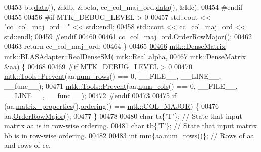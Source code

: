 \begin{DoxyCode}
00453          bb.\hyperlink{classmtk_1_1DenseMatrix_a0c33b8a9e01d157c61ddbdf807c25d84}{data}(), &ldb, &beta, cc\_col\_maj\_ord.\hyperlink{classmtk_1_1DenseMatrix_a0c33b8a9e01d157c61ddbdf807c25d84}{data}(), &ldc);
00454 \textcolor{preprocessor}{  #endif}
00455 
00456 \textcolor{preprocessor}{  #if MTK\_DEBUG\_LEVEL > 0}
00457   std::cout << \textcolor{stringliteral}{"cc\_col\_maj\_ord ="} << std::endl;
00458   std::cout << cc\_col\_maj\_ord << std::endl;
00459 \textcolor{preprocessor}{  #endif}
00460 
00461   cc\_col\_maj\_ord.\hyperlink{classmtk_1_1DenseMatrix_ac2949efba3e8278335d45418c85433e4}{OrderRowMajor}();
00462 
00463   \textcolor{keywordflow}{return} cc\_col\_maj\_ord;
00464 \}
00465 
\hypertarget{mtk__blas__adapter_8cc_source_l00466}{}\hyperlink{classmtk_1_1BLASAdapter_a0dd80d043615a95f11b7341ce69b44d3}{00466} \hyperlink{classmtk_1_1DenseMatrix}{mtk::DenseMatrix} \hyperlink{classmtk_1_1BLASAdapter_a0dd80d043615a95f11b7341ce69b44d3}{mtk::BLASAdapter::RealDenseSM}(
      \hyperlink{group__c01-roots_gac080bbbf5cbb5502c9f00405f894857d}{mtk::Real} alpha,
00467                                                \hyperlink{classmtk_1_1DenseMatrix}{mtk::DenseMatrix} &aa) \{
00468 
00469 \textcolor{preprocessor}{  #if MTK\_DEBUG\_LEVEL > 0}
00470   \hyperlink{classmtk_1_1Tools_a332324c6f25e66be9dff48c5987a3b9f}{mtk::Tools::Prevent}(aa.\hyperlink{classmtk_1_1DenseMatrix_a53f3afb3b6a8d21854458aaa9663cc74}{num\_rows}() == 0, \_\_FILE\_\_, \_\_LINE\_\_, \_\_func\_\_);
00471   \hyperlink{classmtk_1_1Tools_a332324c6f25e66be9dff48c5987a3b9f}{mtk::Tools::Prevent}(aa.\hyperlink{classmtk_1_1DenseMatrix_a41747502d468c6728a4be31501b16e0e}{num\_cols}() == 0, \_\_FILE\_\_, \_\_LINE\_\_, \_\_func\_\_);
00472 \textcolor{preprocessor}{  #endif}
00473 
00475   \textcolor{keywordflow}{if} (aa.\hyperlink{classmtk_1_1DenseMatrix_a5aa83a0643f27a4652ea97630edf7143}{matrix\_properties}().\hyperlink{classmtk_1_1Matrix_a13cd17621652cd5551ff98549bd94df7}{ordering}() == 
      \hyperlink{namespacemtk_ga622801bd9f912d0f976c3e383f5f581ca7c11989c132253fb76b8f6b1314f7e13}{mtk::COL\_MAJOR}) \{
00476     aa.\hyperlink{classmtk_1_1DenseMatrix_ac2949efba3e8278335d45418c85433e4}{OrderRowMajor}();
00477   \}
00478 
00480   \textcolor{keywordtype}{char} ta\{\textcolor{charliteral}{'T'}\}; \textcolor{comment}{// State that input matrix aa is in row-wise ordering.}
00481   \textcolor{keywordtype}{char} tb\{\textcolor{charliteral}{'T'}\}; \textcolor{comment}{// State that input matrix bb is in row-wise ordering.}
00482 
00483   \textcolor{keywordtype}{int} mm\{aa.\hyperlink{classmtk_1_1DenseMatrix_a53f3afb3b6a8d21854458aaa9663cc74}{num\_rows}()\};  \textcolor{comment}{// Rows of aa and rows of cc.}

\end{DoxyCode}
